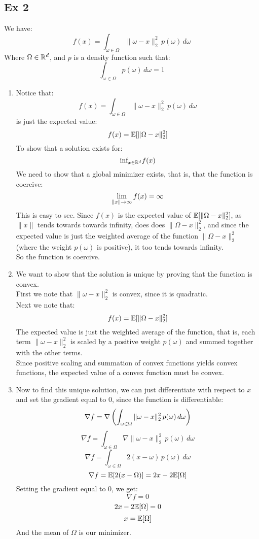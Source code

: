 \documentclass[12pt]{article}
\begin{document}
\subsection*{Ex 2}
We have:
\[ f(x) = \int_{\omega \in \Omega} \|\omega - x\|_2^2 
\, p(\omega) \, d\omega \]
Where $\Omega \in \mathbb{R}^d$, 
and $p$ is a density function such that:
\[\int_{\omega \in \Omega} p(\omega) \, d\omega = 1\]
\begin{enumerate}[label = \letters]
    \item 
    Notice that:
    \[ f(x) = \int_{\omega \in \Omega} \|\omega - x\|_2^2 
    \, p(\omega) \, d\omega \]
    is just the expected value:
    \[ f(x) = \mathbb{E}[\|\Omega - x\|_2^2] \]
    To show that a solution exists for:
    \[ \text{inf}_{x\in \mathbb{R}^d} f(x) \]
    We need to show that a global minimizer exists,
    that is, that the function is coercive:
    \[ \lim_{\|x\| \to \infty} f(x) = \infty \]
    This is easy to see. Since $f(x)$
    is the expected value of $ \mathbb{E}[\|\Omega - x\|_2^2]$,
    as $\|x\|$ tends towards towards infinity,
    does does $\|\Omega - x\|_2^2$,
    and since the expected value is just the weighted
    average of the function $\|\Omega - x\|_2^2$
    (where the weight $p(\omega)$ is positive),
    it too tends towards infinity. \\
    So the function is coercive.
    \item 
    We want to show that the solution is unique
    by proving that the function is convex. \\
    First we note that $\|\omega - x\|_2^2$
    is convex, since it is quadratic. \\
    Next we note that:
    \[ f(x) = \mathbb{E}[\|\Omega - x\|_2^2] \]
    The expected value is just the weighted average
    of the function, that is, each term 
    $\|\omega - x\|_2^2$ is scaled by a positive
    weight $p(\omega)$ and summed together with the other
    terms. \\
    Since positive scaling and summation
    of convex functions yields convex functions,
    the expected value of a convex function must
    be convex.
    \item 
    Now to find this unique solution,
    we can just differentiate
    with respect to $x$ and set the gradient
    equal to $0$, since the function is differentiable:
    \[ \nabla f = \nabla \left( 
    \int_{\omega \in \Omega} \|\omega - x\|_2^2 
    \, p(\omega) \, d\omega \right) \]
    \[ \nabla f = \int_{\omega \in \Omega} 
    \nabla \|\omega - x\|_2^2 \, p(\omega) \, d\omega \]
    \[ \nabla f = \int_{\omega \in \Omega} 
    2(x - \omega) \, p(\omega) \, d\omega \]
    \[ \nabla f = \mathbb{E}[2(x - \Omega)] 
    = 2x - 2\mathbb{E}[\Omega] \]
    Setting the gradient equal to $0$, we get:
    \[ \nabla f = 0 \]
    \[ 2x - 2\mathbb{E}[\Omega] = 0 \]
    \[ x = \mathbb{E}[\Omega] \]
    And the mean of $\Omega$ is our minimizer. \\
\end{enumerate}
\end{document}
